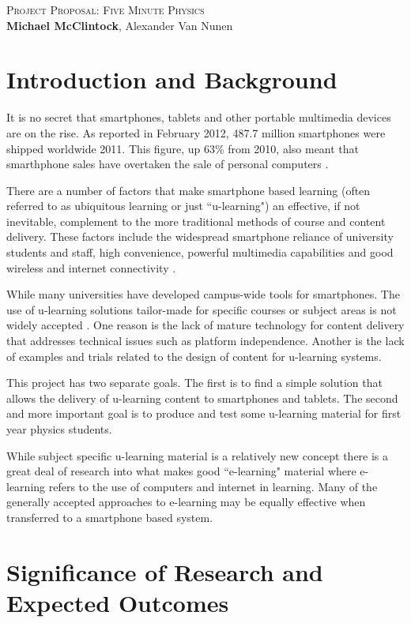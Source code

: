 \documentclass[12pt,a4paper]{article}  %
\begin{document}
\begin{center}
  \textsc{\Large Project Proposal: Five Minute Physics}
  \\[8mm]
  \textbf{Michael McClintock}, Alexander Van Nunen
\end{center}

\section*{Introduction and Background}

It is no secret that smartphones, tablets and other portable
multimedia devices are on the rise. As reported in February 2012,
487.7 million smartphones were shipped worldwide 2011.  This figure,
up 63\% from 2010, also meant that smarthphone sales have overtaken
the sale of personal computers \cite{canalys}. 

There are a number of factors that make smartphone based learning
(often referred to as ubiquitous learning or just ``u-learning") an
effective, if not inevitable, complement to the more traditional
methods of course and content delivery. These factors include the
widespread smartphone reliance of university students and staff, high
convenience, powerful multimedia capabilities and good wireless and
internet connectivity \cite{worry}.

While many universities have developed campus-wide tools for
smartphones. The use of u-learning solutions tailor-made for specific
courses or subject areas is not widely accepted \cite{procsmart}.
One reason is the lack of mature technology for content delivery that
addresses technical issues such as platform independence. Another is the
lack of examples and trials related to the design of content for
u-learning systems.

This project has two separate goals. The first is to find a simple
solution that allows the delivery of u-learning content to smartphones
and tablets. The second and more important goal is to produce and test
some u-learning material for first year physics students.

While subject specific u-learning material is a relatively new concept
there is a great deal of research into what makes good ``e-learning"
material where e-learning refers to the use of computers and internet
in learning. Many of the generally accepted approaches to e-learning
may be equally effective when transferred to a smartphone based
system.

\section*{Significance of Research and Expected Outcomes}
\end{document}
